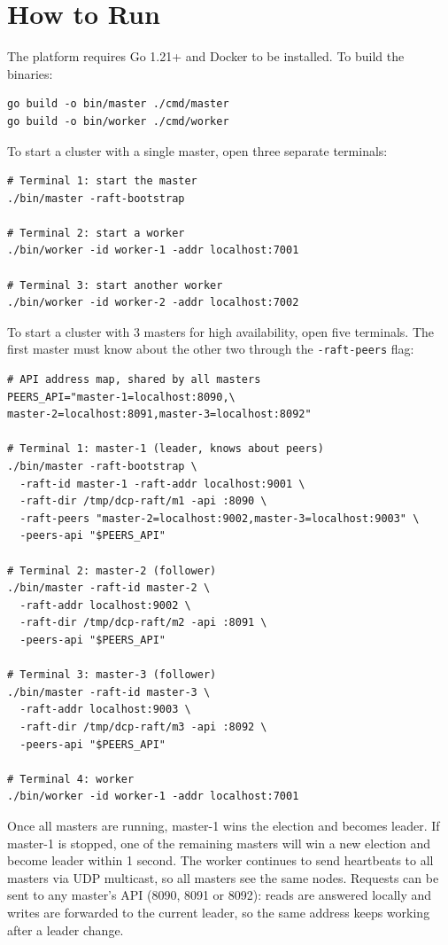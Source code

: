\section{How to Run}

The platform requires Go 1.21+ and Docker to be installed. To build the binaries:

\begin{verbatim}
go build -o bin/master ./cmd/master
go build -o bin/worker ./cmd/worker
\end{verbatim}

To start a cluster with a single master, open three separate terminals:

\begin{verbatim}
# Terminal 1: start the master
./bin/master -raft-bootstrap

# Terminal 2: start a worker
./bin/worker -id worker-1 -addr localhost:7001

# Terminal 3: start another worker
./bin/worker -id worker-2 -addr localhost:7002
\end{verbatim}

To start a cluster with 3 masters for high availability, open five terminals. The first master must know about the other two through the \texttt{-raft-peers} flag:

\begin{verbatim}
# API address map, shared by all masters
PEERS_API="master-1=localhost:8090,\
master-2=localhost:8091,master-3=localhost:8092"

# Terminal 1: master-1 (leader, knows about peers)
./bin/master -raft-bootstrap \
  -raft-id master-1 -raft-addr localhost:9001 \
  -raft-dir /tmp/dcp-raft/m1 -api :8090 \
  -raft-peers "master-2=localhost:9002,master-3=localhost:9003" \
  -peers-api "$PEERS_API"

# Terminal 2: master-2 (follower)
./bin/master -raft-id master-2 \
  -raft-addr localhost:9002 \
  -raft-dir /tmp/dcp-raft/m2 -api :8091 \
  -peers-api "$PEERS_API"

# Terminal 3: master-3 (follower)
./bin/master -raft-id master-3 \
  -raft-addr localhost:9003 \
  -raft-dir /tmp/dcp-raft/m3 -api :8092 \
  -peers-api "$PEERS_API"

# Terminal 4: worker
./bin/worker -id worker-1 -addr localhost:7001
\end{verbatim}

Once all masters are running, master-1 wins the election and becomes leader. If master-1 is stopped, one of the remaining masters will win a new election and become leader within 1 second. The worker continues to send heartbeats to all masters via UDP multicast, so all masters see the same nodes. Requests can be sent to any master's API (8090, 8091 or 8092): reads are answered locally and writes are forwarded to the current leader, so the same address keeps working after a leader change.

